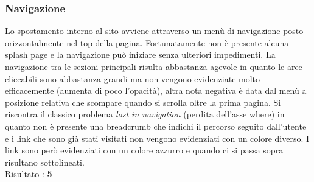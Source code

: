 \subsubsection{Navigazione}
Lo spostamento interno al sito avviene attraverso un menù di navigazione posto
orizzontalmente nel top della pagina. Fortunatamente non è presente alcuna
splash page e la navigazione può iniziare senza ulteriori impedimenti. 
La navigazione tra le sezioni principali
risulta abbastanza agevole in quanto le aree cliccabili sono abbastanza grandi
ma non vengono evidenziate molto efficacemente (aumenta di poco l'opacità),
altra nota negativa è data dal 
menù a posizione relativa che scompare quando si scrolla oltre la prima pagina.
Si riscontra il classico problema \textit{lost in navigation} (perdita dell'asse
where) in quanto non è
presente una breadcrumb che indichi il percorso seguito dall'utente e i link che 
sono già stati visitati non vengono evidenziati con un colore diverso. I link 
sono però evidenziati con un colore azzurro e quando ci si passa sopra risultano
sottolineati. \\
Risultato : \textbf{5}